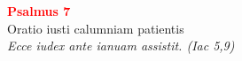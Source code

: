 


\def\greinitialformat#1{%
{\fontsize{39}{39}\selectfont #1}%
}




\vspace{0.3cm}
\begin{center}
 \textcolor{red}{\large \bf Psalmus 7}\\
Oratio iusti calumniam patientis\\
\textit{\small Ecce iudex ante ianuam assistit. (Iac 5,9)}
\end{center}
